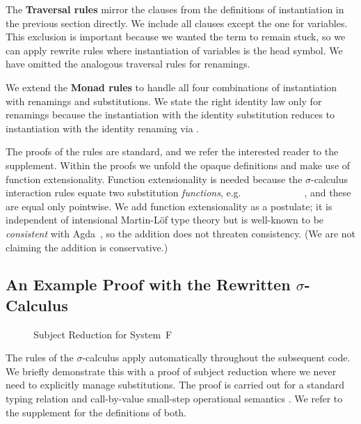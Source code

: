 \documentclass[a4paper,UKenglish,cleveref, autoref, thm-restate,anonymous]{lipics-v2021}
\begin{document}
The \textbf{Traversal rules} mirror the clauses from the definitions of
instantiation in the previous section directly. We include all clauses except
the one for variables. This exclusion is important because we wanted the term
   to remain stuck, so we can apply
rewrite rules where instantiation of variables is the head symbol. We have
omitted the analogous traversal rules for renamings.

We extend the \textbf{Monad rules} to handle all four combinations of
instantiation with renamings and substitutions. We state the right identity law
only for renamings because the instantiation with the identity substitution
reduces to instantiation with the identity renaming via
.

The proofs of the rules are standard, and we refer the interested reader to
the supplement. Within the proofs we unfold the opaque definitions and make
use of function extensionality. Function extensionality is needed because the
$σ$-calculus interaction rules equate two substitution
\emph{functions}, e.g.~~\AgdaSymbol{:}~\AgdaSymbol{(}~~\AgdaSymbol{)}~~~~~~\AgdaSymbol{(}~~\AgdaSymbol{)}, and these are equal only pointwise.
We add function extensionality as a postulate; it is independent of intensional
Martin-Löf type theory but is well-known to be \emph{consistent} with
Agda~\cite{Hofmann1997}, so the addition does not threaten consistency. (We
are not claiming the addition is conservative.)

\subsection{An Example Proof with the Rewritten $σ$-Calculus}
\begin{figure}[!t]
      \AgdaNoSpaceAroundCode{}
      \setlength{\mathindent}{0pt}
      \begin{minipage}[t]{0.48\linewidth}
            \raggedright{}
            \ESPT{}
      \end{minipage}
      \begin{minipage}[t]{0.48\linewidth}
            \raggedright{}
            \ESR{}
      \end{minipage}
      \caption{Subject Reduction for System~F}\label{fig:ext-rst}
\end{figure}
The rules of the $σ$-calculus apply automatically throughout the subsequent
code. We briefly demonstrate this with a proof of subject reduction where we
never need to explicitly manage substitutions. The proof is carried out for a
standard typing relation  and call-by-value small-step
operational semantics . We refer to the supplement for the
definitions of both.
\end{document}
